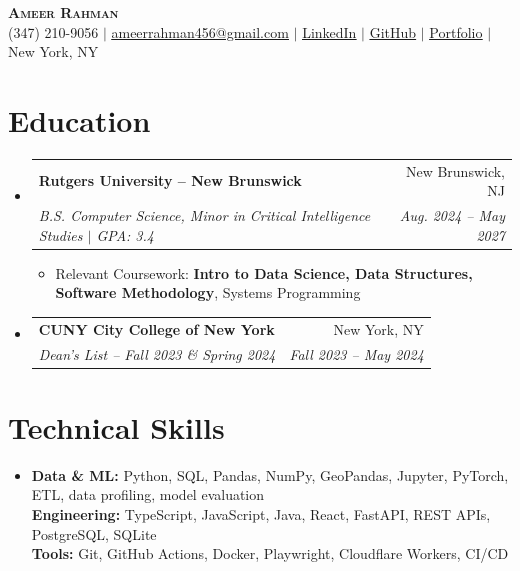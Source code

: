 \documentclass[letterpaper,10pt]{article}
\makeatletter
\newcommand{\resumeItem}[1]{\item\small{#1}}
\newcommand{\resumeSubheading}[4]{
  \vspace{1pt}\item
  \begin{tabular*}{0.97\textwidth}[t]{l@{\extracolsep{\fill}}r}
    \textbf{#1} & #2 \\
    \textit{\small #3} & \textit{\small #4} \\
  \end{tabular*}\vspace{-3pt}
}
\newcommand{\resumeSubHeadingListStart}{\begin{itemize}[leftmargin=0.15in,label={},itemsep=0pt,topsep=0pt]}
\newcommand{\resumeSubHeadingListEnd}{\end{itemize}}
\newcommand{\resumeItemListStart}{\begin{itemize}[leftmargin=0.15in,label=\textbullet,itemsep=-2pt,topsep=0pt]}
\newcommand{\resumeItemListEnd}{\end{itemize}\vspace{0pt}}
\makeatother
\begin{document}
\begin{center}
  {\Huge\scshape\textbf{Ameer Rahman}} \\ \vspace{2pt}
  \small (347) 210-9056 $|$
  \href{mailto:ameerrahman456@gmail.com}{\underline{ameerrahman456@gmail.com}} $|$
  \href{https://www.linkedin.com/in/ameer-rahman-a3bb232a0/}{\underline{LinkedIn}} $|$
  \href{https://github.com/ameer-rah}{\underline{GitHub}} $|$
  \href{https://ameer-rahman.info/}{\underline{Portfolio}} $|$ New York, NY
\end{center}

\section{Education}
\resumeSubHeadingListStart
  \resumeSubheading{Rutgers University -- New Brunswick}{New Brunswick, NJ}
    {B.S. Computer Science, Minor in Critical Intelligence Studies $|$ GPA: 3.4}{Aug. 2024 -- May 2027}
    \resumeItemListStart
      \resumeItem{Relevant Coursework: \textbf{Intro to Data Science, Data Structures, Software Methodology}, Systems Programming}
    \resumeItemListEnd
  \resumeSubheading{CUNY City College of New York}{New York, NY}
    {Dean's List -- Fall 2023 \& Spring 2024}{Fall 2023 -- May 2024}
\resumeSubHeadingListEnd

\section{Technical Skills}
\begin{itemize}[leftmargin=0.15in,label={},topsep=0pt]
  \small\item{
    \textbf{Data \& ML:} Python, SQL, Pandas, NumPy, GeoPandas, Jupyter, PyTorch, ETL, data profiling, model evaluation \\
    \textbf{Engineering:} TypeScript, JavaScript, Java, React, FastAPI, REST APIs, PostgreSQL, SQLite \\
    \textbf{Tools:} Git, GitHub Actions, Docker, Playwright, Cloudflare Workers, CI/CD
  }
\end{itemize}
\end{document}
